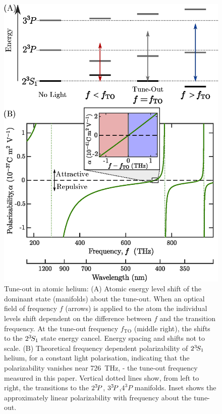 	\begin{figure} 
		\centering
		\includegraphics[width=\textwidth]{fig/tuneout/composite_polz_fig}
		\caption{Tune-out in atomic helium:
		(A) Atomic energy level shift of the dominant state (manifolds) about the tune-out.  When an optical field of frequency $f$ (arrows) is applied to the atom the individual
		levels shift dependent on the difference between $f$ and the transition frequency. At the tune-out frequency $f_{\mathrm{TO}}$ (middle right), the shifts to the $2^{3\!}S_1$ state energy cancel.
		Energy spacing and shifts not to scale.
		(B) Theoretical frequency dependent polarizability of $2^{3\!}S_1$ helium, for a constant light polarisation, indicating that the polarizability vanishes near 726~THz, - the tune-out frequency measured in this paper. 
		Vertical dotted lines show, from left to right, the transitions to the  $2^{3\!}P$, $3^{3\!}P$,$4^{3\!}P$ manifolds. Inset shows the approximately linear polarizability with frequency about the tune-out.
		}
		\label{fig:he_polz} 
	\end{figure}



